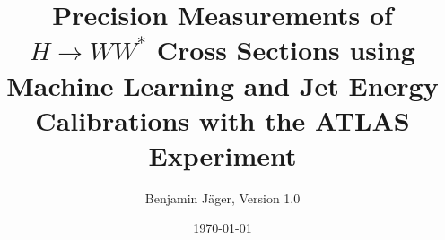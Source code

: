 

\endofdump


% 

\newif\ifIMAGES
\IMAGEStrue




\newcommand{\paperfiguredir}{figures/paper-figures}

\author{Benjamin Jäger, Version 1.0}
\date{\today}
\title{Precision Measurements of $H \to WW^*$ Cross Sections using Machine Learning and Jet Energy Calibrations with the ATLAS Experiment}





\maketitle





\tableofcontents


\newcommand{\chapterdir}{chapters}
%

% 

% 

